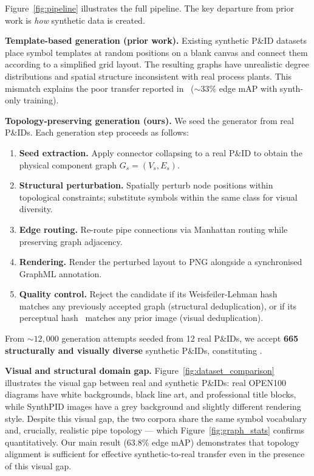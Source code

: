 Figure~\ref{fig:pipeline} illustrates the full pipeline.
The key departure from prior work is \emph{how} synthetic data is created.

\noindent\textbf{Template-based generation (prior work).}
Existing synthetic P\&ID datasets~\cite{paliwal2021,sturmer2025} place
symbol templates at random positions on a blank canvas and connect them
according to a simplified grid layout.
The resulting graphs have unrealistic degree distributions and spatial
structure inconsistent with real process plants.
This mismatch explains the poor transfer reported
in~\cite{sturmer2025} (${\sim}33\%$ edge mAP with synth-only training).

\noindent\textbf{Topology-preserving generation (ours).}
We seed the generator from real P\&IDs.
Each generation step proceeds as follows:
\begin{enumerate}[noitemsep, topsep=2pt, leftmargin=1.3em]
    \item \textbf{Seed extraction.} Apply connector collapsing to a real
          P\&ID to obtain the physical component graph
          $G_s = (V_s, E_s)$.
    \item \textbf{Structural perturbation.} Spatially perturb node
          positions within topological constraints; substitute symbols
          within the same class for visual diversity.
    \item \textbf{Edge routing.} Re-route pipe connections via
          Manhattan routing while preserving graph adjacency.
    \item \textbf{Rendering.} Render the perturbed layout to PNG
          alongside a synchronised GraphML annotation.
    \item \textbf{Quality control.}
          Reject the candidate if its Weisfeiler-Lehman
          hash~\cite{shervashidze2011} matches any previously accepted
          graph (structural deduplication), or if its perceptual
          hash~\cite{phash} matches any prior image (visual
          deduplication).
\end{enumerate}

From ${\sim}12{,}000$ generation attempts seeded from 12 real P\&IDs,
we accept \textbf{665 structurally and visually diverse} synthetic
P\&IDs, constituting \ours{}.

\noindent\textbf{Visual and structural domain gap.}
Figure~\ref{fig:dataset_comparison} illustrates the visual gap between
real and synthetic P\&IDs: real OPEN100 diagrams have white backgrounds,
black line art, and professional title blocks, while SynthPID images have
a grey background and slightly different rendering style.
Despite this visual gap, the two corpora share the same symbol vocabulary
and, crucially, realistic pipe topology — which Figure~\ref{fig:graph_stats}
confirms quantitatively.
Our main result (63.8\% edge mAP) demonstrates that topology alignment
is sufficient for effective synthetic-to-real transfer even in the
presence of this visual gap.

